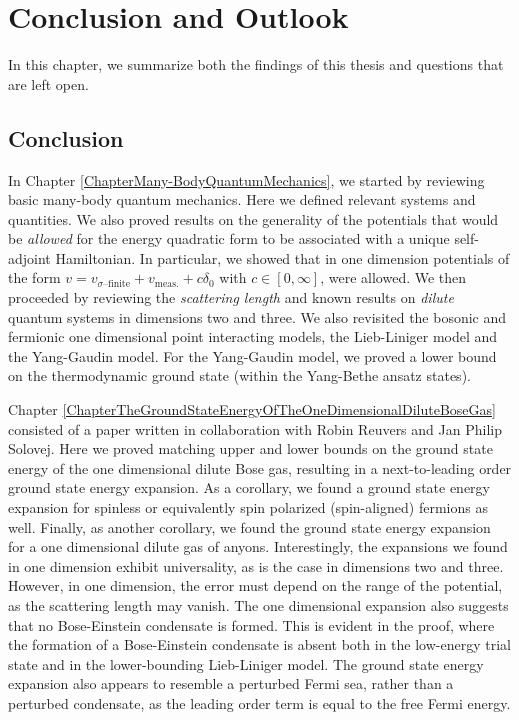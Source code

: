 \chapter{Conclusion and Outlook}
\label{ChapterConclusionAndOutlook}
In this chapter, we summarize both the findings of this thesis and questions that are left open.
\section{Conclusion}
In Chapter \ref{ChapterMany-BodyQuantumMechanics}, we started by reviewing basic many-body quantum mechanics. Here we defined relevant systems and quantities. We also proved results on the generality of the potentials that would be \emph{allowed} for the energy quadratic form to be associated with a unique self-adjoint Hamiltonian. In particular, we showed that in one dimension potentials of the form $ v=v_{\sigma\text{--finite}}+v_{\text{meas.}} +c\delta_0 $ with $ c\in[0,\infty] $, were allowed. We then proceeded by reviewing the \emph{scattering length} and known results on \emph{dilute} quantum systems in dimensions two and three. We also revisited the bosonic and fermionic one dimensional point interacting models, \ie the Lieb-Liniger model and the Yang-Gaudin model.
For the Yang-Gaudin model, we proved a lower bound on the thermodynamic ground state (within the Yang-Bethe ansatz states).

Chapter \ref{ChapterTheGroundStateEnergyOfTheOneDimensionalDiluteBoseGas} consisted of a paper written in collaboration with Robin Reuvers and Jan Philip Solovej. Here we proved matching upper and lower bounds on the ground state energy of the one dimensional dilute Bose gas, resulting in a next-to-leading order ground state energy expansion. As a corollary, we found a ground state energy expansion for spinless or equivalently spin polarized (spin-aligned) fermions as well. Finally, as another corollary, we found the ground state energy expansion for a one dimensional dilute gas of anyons. Interestingly, the expansions we found in one dimension exhibit universality, as is the case in dimensions two and three. However, in one dimension, the error must depend on the range of the potential, as the scattering length may vanish. The one dimensional expansion also suggests that no Bose-Einstein condensate is formed. This is evident in the proof, where the formation of a Bose-Einstein condensate is absent both in the low-energy trial state and in the lower-bounding Lieb-Liniger model. The ground state energy expansion also appears to resemble a perturbed Fermi sea, rather than a perturbed condensate, as the leading order term is equal to the free Fermi energy.

